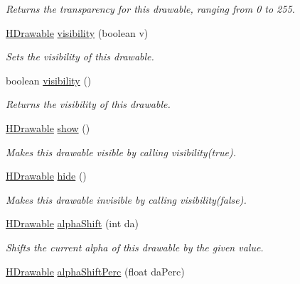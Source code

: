 \begin{DoxyCompactItemize}
\begin{DoxyCompactList}\small\item\em Returns the transparency for this drawable, ranging from 0 to 255. \end{DoxyCompactList}\item 
\hyperlink{classhype_1_1drawable_1_1_h_drawable}{H\-Drawable} \hyperlink{classhype_1_1drawable_1_1_h_drawable_a6417fd46b70ffc329969f6c492f652e4}{visibility} (boolean v)
\begin{DoxyCompactList}\small\item\em Sets the visibility of this drawable. \end{DoxyCompactList}\item 
boolean \hyperlink{classhype_1_1drawable_1_1_h_drawable_aa79392f2459864795224477e941618cc}{visibility} ()
\begin{DoxyCompactList}\small\item\em Returns the visibility of this drawable. \end{DoxyCompactList}\item 
\hyperlink{classhype_1_1drawable_1_1_h_drawable}{H\-Drawable} \hyperlink{classhype_1_1drawable_1_1_h_drawable_a5b8fa14e65c5728b24f8f3eb0c64607a}{show} ()
\begin{DoxyCompactList}\small\item\em Makes this drawable visible by calling {\ttfamily visibility(true)}. \end{DoxyCompactList}\item 
\hyperlink{classhype_1_1drawable_1_1_h_drawable}{H\-Drawable} \hyperlink{classhype_1_1drawable_1_1_h_drawable_adc8b09823e0c47cf1e72df0820dad1e3}{hide} ()
\begin{DoxyCompactList}\small\item\em Makes this drawable invisible by calling {\ttfamily visibility(false)}. \end{DoxyCompactList}\item 
\hyperlink{classhype_1_1drawable_1_1_h_drawable}{H\-Drawable} \hyperlink{classhype_1_1drawable_1_1_h_drawable_acf22a86de606bdd313d4d45e6615a6ae}{alpha\-Shift} (int da)
\begin{DoxyCompactList}\small\item\em Shifts the current alpha of this drawable by the given value. \end{DoxyCompactList}\item 
\hyperlink{classhype_1_1drawable_1_1_h_drawable}{H\-Drawable} \hyperlink{classhype_1_1drawable_1_1_h_drawable_a8a62af5b97563ca02a2b1d6824e6cc75}{alpha\-Shift\-Perc} (float da\-Perc)

\end{DoxyCompactItemize}
